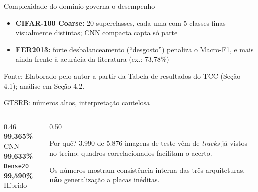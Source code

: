 \documentclass[aspectratio=169,11pt,brazil]{beamer}
\newcommand{\fonte}[1]{\par\vfill{\tiny\color{gray}Fonte: #1\par}}
\begin{document}
\begin{frame}{Complexidade do domínio governa o desempenho}
  \centering

  \begin{itemize}\small
    \item \textbf{CIFAR-100 Coarse:} 20 superclasses, cada uma com 5 classes finas visualmente distintas; CNN compacta capta só parte
    \item \textbf{FER2013:} forte desbalanceamento (``desgosto'') penaliza o Macro-F1, e mais ainda frente à acurácia da literatura (ex.: 73,78\%)
  \end{itemize}
  \fonte{Elaborado pelo autor a partir da Tabela de resultados do TCC (Seção 4.1); análise em Seção 4.2.}
\end{frame}

\begin{frame}{GTSRB: números altos, interpretação cautelosa}
  \begin{columns}[c]
    \begin{column}{0.46\textwidth}
      \centering
      \Large
      \textbf{99,365\%} CNN\\
      \textbf{99,633\%} \texttt{Dense20}\\
      \textbf{99,590\%} Híbrido
    \end{column}
    \begin{column}{0.50\textwidth}
      \begin{alertblock}{Por quê?}
        3.990 de 5.876 imagens de teste vêm de \textit{tracks} já vistos no treino: quadros correlacionados facilitam o acerto.
      \end{alertblock}
      \small Os números mostram consistência interna das três arquiteturas, \textbf{não} generalização a placas inéditas.
    \end{column}
  \end{columns}
\end{frame}
\end{document}
